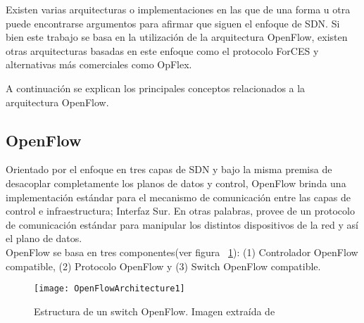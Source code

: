 Existen varias arquitecturas o implementaciones en las que de una forma u otra puede encontrarse argumentos para afirmar que siguen el enfoque de SDN. Si bien este trabajo se basa en la utilización de la arquitectura OpenFlow, existen otras arquitecturas basadas en este enfoque como el protocolo ForCES y alternativas m\'as comerciales como OpFlex.

A continuaci\'on se explican los principales conceptos relacionados a la arquitectura OpenFlow.

\subsection{OpenFlow}

Orientado por el enfoque en tres capas de SDN y bajo la misma premisa de desacoplar completamente los planos de datos y control, OpenFlow\cite{mckeown2008openflow} brinda una implementaci\'on estándar para el mecanismo de comunicación entre las capas de control e infraestructura; Interfaz Sur. En otras palabras, provee de un protocolo de comunicación estándar para manipular los distintos dispositivos de la red y así el plano de datos.\\ 

OpenFlow se basa en tres componentes(ver figura ~\ref{fig:OpenFlowArch}): (1) Controlador OpenFlow compatible, (2) Protocolo OpenFlow y (3) Switch OpenFlow compatible.

  


\begin{figure}[htbp!] 
\centering    
\texttt{[image: OpenFlowArchitecture1]}
\caption[Estructura de un switch OpenFlow]{Estructura de un switch OpenFlow. Imagen extraída de \cite{mckeown2008openflow}}
\label{fig:OpenFlowArch}
\end{figure}

